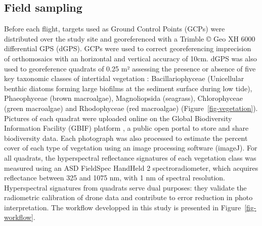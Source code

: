 \documentclass[
  number]{elsarticle}
\begin{document}
\subsection{Field sampling}\label{field-sampling}

Before each flight, targets used as Ground Control Points (GCPs) were
distributed over the study site and georeferenced with a Trimble © Geo
XH 6000 differential GPS (dGPS). GCPs were used to correct
georeferencing imprecision of orthomosaics with an horizontal and
vertical accuracy of 10cm. dGPS was also used to georeference quadrats
of 0.25 m² assessing the presence or absence of five key taxonomic
classes of intertidal vegetation : Bacillariophyceae (Unicellular
benthic diatoms forming large biofilms at the sediment surface during
low tide), Phaeophyceae (brown macroalgae), Magnoliopsida (seagrass),
Chlorophyceae (green macroalgae) and Rhodophyceae (red macroalgae)
(Figure~\ref{fig-vegetation}). Pictures of each quadrat were uploaded
online on the Global Biodiversity Information Facility (GBIF) platform
\citep{BedeGbif}, a public open portal to store and share biodiversity
data. Each photograph was also processed to estimate the percent cover
of each type of vegetation using an image processing software (imageJ).
For all quadrats, the hyperspectral reflectance signatures of each
vegetation class was measured using an ASD FieldSpec HandHeld 2
spectroradiometer, which acquires reflectance between 325 and 1075 nm,
with 1 nm of spectral resolution. Hyperspectral signatures from quadrats
serve dual purposes: they validate the radiometric calibration of drone
data and contribute to error reduction in photo interpretation. The
workflow developped in this study is presented in
Figure~\ref{fig-workflow}.
\end{document}
